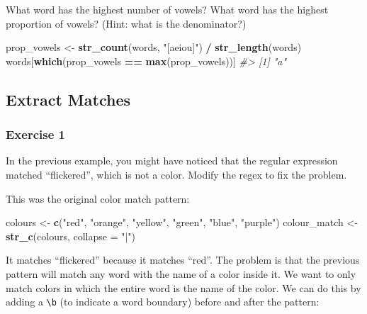 \documentclass[]{book}
\newenvironment{Shaded}{\begin{snugshade}}{\end{snugshade}}
\newcommand{\CommentTok}[1]{\textcolor[rgb]{0.56,0.35,0.01}{\textit{#1}}}
\newcommand{\DataTypeTok}[1]{\textcolor[rgb]{0.13,0.29,0.53}{#1}}
\newcommand{\KeywordTok}[1]{\textcolor[rgb]{0.13,0.29,0.53}{\textbf{#1}}}
\newcommand{\NormalTok}[1]{#1}
\newcommand{\OperatorTok}[1]{\textcolor[rgb]{0.81,0.36,0.00}{\textbf{#1}}}
\newcommand{\StringTok}[1]{\textcolor[rgb]{0.31,0.60,0.02}{#1}}
\theoremstyle{definition}
\theoremstyle{definition}
\theoremstyle{definition}
\theoremstyle{remark}
\begin{document}
What word has the highest number of vowels? What word has the highest
proportion of vowels? (Hint: what is the denominator?)

\begin{Shaded}
\begin{Highlighting}[]
\NormalTok{prop_vowels <-}\StringTok{ }\KeywordTok{str_count}\NormalTok{(words, }\StringTok{"[aeiou]"}\NormalTok{) }\OperatorTok{/}\StringTok{ }\KeywordTok{str_length}\NormalTok{(words)}
\NormalTok{words[}\KeywordTok{which}\NormalTok{(prop_vowels }\OperatorTok{==}\StringTok{ }\KeywordTok{max}\NormalTok{(prop_vowels))]}
\CommentTok{#> [1] "a"}
\end{Highlighting}
\end{Shaded}

\hypertarget{extract-matches}{%
\subsection{Extract Matches}\label{extract-matches}}

\hypertarget{exercise-1-32}{%
\subsubsection{Exercise 1}\label{exercise-1-32}}

In the previous example, you might have noticed that the regular
expression matched ``flickered'', which is not a color. Modify the regex
to fix the problem.

This was the original color match pattern:

\begin{Shaded}
\begin{Highlighting}[]
\NormalTok{colours <-}\StringTok{ }\KeywordTok{c}\NormalTok{(}\StringTok{"red"}\NormalTok{, }\StringTok{"orange"}\NormalTok{, }\StringTok{"yellow"}\NormalTok{, }\StringTok{"green"}\NormalTok{, }\StringTok{"blue"}\NormalTok{, }\StringTok{"purple"}\NormalTok{)}
\NormalTok{colour_match <-}\StringTok{ }\KeywordTok{str_c}\NormalTok{(colours, }\DataTypeTok{collapse =} \StringTok{"|"}\NormalTok{)}
\end{Highlighting}
\end{Shaded}

It matches ``flickered'' because it matches ``red''. The problem is that
the previous pattern will match any word with the name of a color inside
it. We want to only match colors in which the entire word is the name of
the color. We can do this by adding a \texttt{\textbackslash{}b} (to
indicate a word boundary) before and after the pattern:
\end{document}
